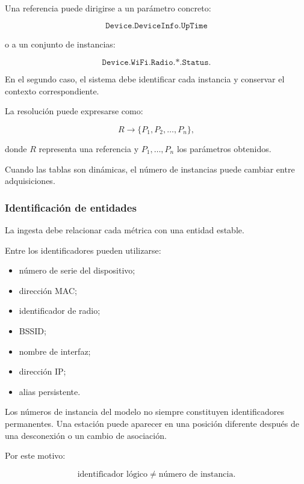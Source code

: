 Una referencia puede dirigirse a un parámetro concreto:

\[
    \texttt{Device.DeviceInfo.UpTime}
\]

o a un conjunto de instancias:

\[
    \texttt{Device.WiFi.Radio.*.Status}.
\]

En el segundo caso, el sistema debe identificar cada instancia y
conservar el contexto correspondiente.

La resolución puede expresarse como:

\[
    R
    \longrightarrow
    \{
        P_1,
        P_2,
        \ldots,
        P_n
    \},
\]

donde \(R\) representa una referencia y \(P_1,\ldots,P_n\) los parámetros
obtenidos.

Cuando las tablas son dinámicas, el número de instancias puede cambiar
entre adquisiciones.


\subsubsection*{Identificación de entidades}

La ingesta debe relacionar cada métrica con una entidad estable.

Entre los identificadores pueden utilizarse:

\begin{itemize}
    \item número de serie del dispositivo;

    \item dirección MAC;

    \item identificador de radio;

    \item BSSID;

    \item nombre de interfaz;

    \item dirección IP;

    \item alias persistente.
\end{itemize}

Los números de instancia del modelo no siempre constituyen
identificadores permanentes. Una estación puede aparecer en una posición
diferente después de una desconexión o un cambio de asociación.

Por este motivo:

\[
    \text{identificador lógico}
    \neq
    \text{número de instancia}.
\]

